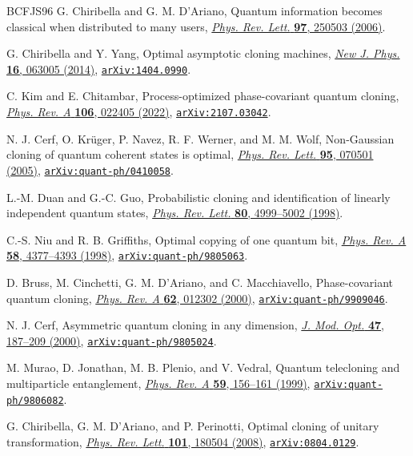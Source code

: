 \documentclass[11pt]{article}
\theoremstyle{remark}
\theoremstyle{plain}
\newcommand{\doi}[2]{\href{https://doi.org/#1}{#2}}
\newcommand{\arxiv}[1]{\href{https://arxiv.org/abs/#1}{\texttt{arXiv:#1}}}
\begin{document}
\begin{thebibliography}{BCFJS96}
G. Chiribella and G. M. D'Ariano,
Quantum information becomes classical when distributed to many users,
\doi{10.1103/PhysRevLett.97.250503}{\emph{Phys. Rev. Lett.} \textbf{97}, 250503 (2006)}.

G. Chiribella and Y. Yang,
Optimal asymptotic cloning machines,
\doi{10.1088/1367-2630/16/6/063005}{\emph{New J. Phys.} \textbf{16}, 063005 (2014)},
\arxiv{1404.0990}.

C. Kim and E. Chitambar,
Process-optimized phase-covariant quantum cloning,
\doi{10.1103/PhysRevA.106.022405}{\emph{Phys. Rev. A} \textbf{106}, 022405 (2022)},
\arxiv{2107.03042}.

N. J. Cerf, O. Kr\"uger, P. Navez, R. F. Werner, and M. M. Wolf,
Non-Gaussian cloning of quantum coherent states is optimal,
\doi{10.1103/PhysRevLett.95.070501}{\emph{Phys. Rev. Lett.} \textbf{95}, 070501 (2005)},
\arxiv{quant-ph/0410058}.

L.-M. Duan and G.-C. Guo,
Probabilistic cloning and identification of linearly independent quantum states,
\doi{10.1103/PhysRevLett.80.4999}{\emph{Phys. Rev. Lett.} \textbf{80}, 4999--5002 (1998)}.

C.-S. Niu and R. B. Griffiths,
Optimal copying of one quantum bit,
\doi{10.1103/PhysRevA.58.4377}{\emph{Phys. Rev. A} \textbf{58}, 4377--4393 (1998)},
\arxiv{quant-ph/9805063}.

D. Bruss, M. Cinchetti, G. M. D'Ariano, and C. Macchiavello,
Phase-covariant quantum cloning,
\doi{10.1103/PhysRevA.62.012302}{\emph{Phys. Rev. A} \textbf{62}, 012302 (2000)},
\arxiv{quant-ph/9909046}.

N. J. Cerf,
Asymmetric quantum cloning in any dimension,
\doi{10.1080/09500340008244036}{\emph{J. Mod. Opt.} \textbf{47}, 187--209 (2000)},
\arxiv{quant-ph/9805024}.

M. Murao, D. Jonathan, M. B. Plenio, and V. Vedral,
Quantum telecloning and multiparticle entanglement,
\doi{10.1103/PhysRevA.59.156}{\emph{Phys. Rev. A} \textbf{59}, 156--161 (1999)},
\arxiv{quant-ph/9806082}.

G. Chiribella, G. M. D'Ariano, and P. Perinotti,
Optimal cloning of unitary transformation,
\doi{10.1103/PhysRevLett.101.180504}{\emph{Phys. Rev. Lett.} \textbf{101}, 180504 (2008)},
\arxiv{0804.0129}.


\end{thebibliography}
\end{document}
